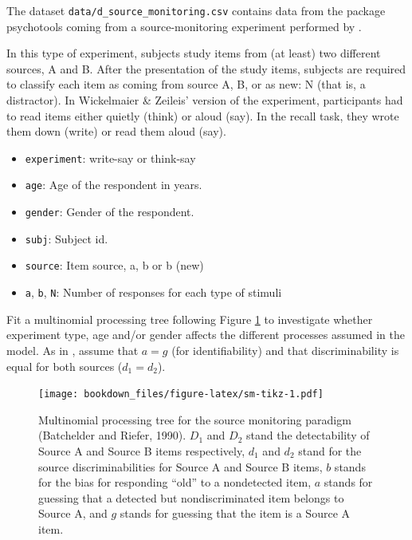 \documentclass[12pt,]{krantz}
\providecommand{\tightlist}{%
  \setlength{\itemsep}{0pt}\setlength{\parskip}{0pt}}
\theoremstyle{definition}
\theoremstyle{definition}
\theoremstyle{definition}
\theoremstyle{remark}
\begin{document}
The dataset \texttt{data/d\_source\_monitoring.csv} contains data from the package psychotools coming from a source-monitoring experiment \citep{batchelder1990multinomial} performed by \citet{wickelmaier2018using}.

In this type of experiment, subjects study items from (at least) two different sources, A and B. After the presentation of the study items, subjects are required to classify each item as coming from source A, B, or as new: N (that is, a distractor). In Wickelmaier \& Zeileis' version of the experiment, participants had to read items either quietly (think) or aloud (say). In the recall task, they wrote them down (write) or read them aloud (say).

\begin{itemize}
\tightlist
\item
  \texttt{experiment}: write-say or think-say
\item
  \texttt{age}: Age of the respondent in years.
\item
  \texttt{gender}: Gender of the respondent.
\item
  \texttt{subj}: Subject id.
\item
  \texttt{source}: Item source, a, b or b (new)
\item
  \texttt{a}, \texttt{b}, \texttt{N}: Number of responses for each type of stimuli
\end{itemize}

Fit a multinomial processing tree following Figure \ref{fig:sm-tikz}
to investigate whether experiment type, age and/or gender affects the different processes assumed in the model.
As in \citet{batchelder1990multinomial}, assume that \(a = g\) (for identifiability) and that discriminability is equal for both sources (\(d_1 = d_2\)).



\begin{figure}
\centering
\texttt{[image: bookdown\_files/figure-latex/sm-tikz-1.pdf]}
\caption{\label{fig:sm-tikz}Multinomial processing tree for the source monitoring paradigm (Batchelder and Riefer, 1990). \(D_1\) and \(D_2\) stand the detectability of Source A and Source B items respectively, \(d_1\) and \(d_2\) stand for the source discriminabilities for Source A and Source B items, \(b\) stands for the bias for responding ``old'' to a nondetected item, \(a\) stands for guessing that a detected but nondiscriminated item belongs to Source A, and \(g\) stands for guessing that the item is a Source A item.}
\end{figure}
\end{document}
